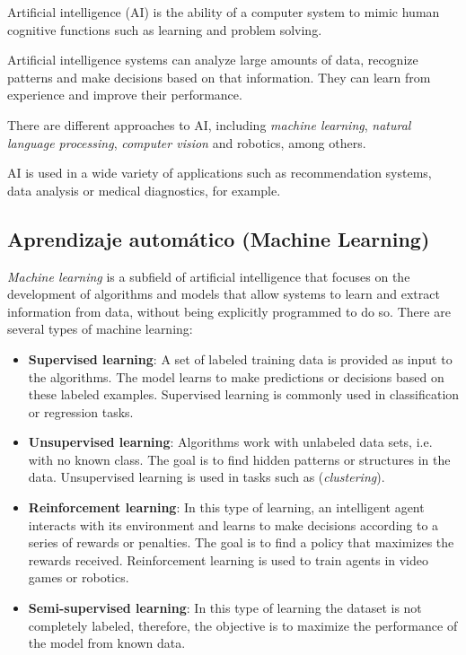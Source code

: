 Artificial intelligence (AI) is the ability of a computer system to mimic human cognitive functions such as learning and problem solving.

Artificial intelligence systems can analyze large amounts of data, recognize patterns and make decisions based on that information. They can learn from experience and improve their performance.

There are different approaches to AI, including \textit{machine learning}, \textit{natural language processing}, \textit{computer vision} and robotics, among others.

AI is used in a wide variety of applications such as recommendation systems, data analysis or medical diagnostics, for example.

\subsection{Aprendizaje automático (Machine Learning)}
\textit{Machine learning} is a subfield of artificial intelligence that focuses on the development of algorithms and models that allow systems to learn and extract information from data, without being explicitly programmed to do so.
There are several types of machine learning:

\begin{itemize}
\item \textbf{Supervised learning}: A set of labeled training data is provided as input to the algorithms. The model learns to make predictions or decisions based on these labeled examples. Supervised learning is commonly used in classification or regression tasks.

\item \textbf{Unsupervised learning}: Algorithms work with unlabeled data sets, i.e. with no known class. The goal is to find hidden patterns or structures in the data. Unsupervised learning is used in tasks such as (\textit{clustering}).

\item \textbf{Reinforcement learning}: In this type of learning, an intelligent agent interacts with its environment and learns to make decisions according to a series of rewards or penalties. The goal is to find a policy that maximizes the rewards received. Reinforcement learning is used to train agents in video games or robotics.

\item \textbf{Semi-supervised learning}: In this type of learning the dataset is not completely labeled, therefore, the objective is to maximize the performance of the model from known data.
\end{itemize}

